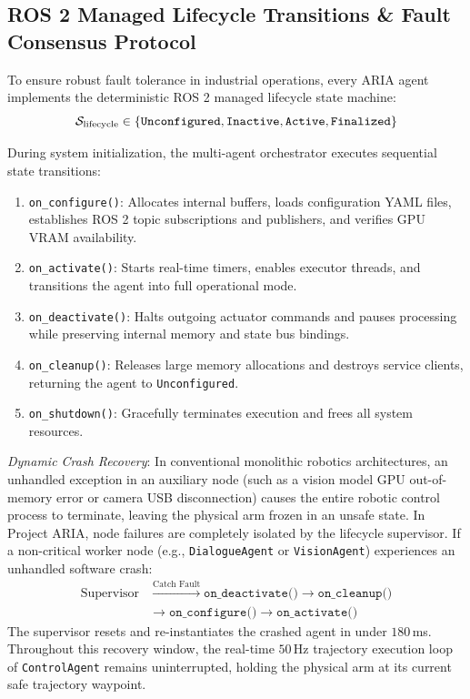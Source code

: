 \documentclass[journal]{IEEEtran}
\begin{document}
\subsection{ROS 2 Managed Lifecycle Transitions \& Fault Consensus Protocol}
To ensure robust fault tolerance in industrial operations, every ARIA agent implements the deterministic ROS 2 managed lifecycle state machine:
\begin{equation}
\mathcal{S}_{\text{lifecycle}} \in \{\text{\texttt{Unconfigured}}, \text{\texttt{Inactive}}, \text{\texttt{Active}}, \text{\texttt{Finalized}}\}
\end{equation}

During system initialization, the multi-agent orchestrator executes sequential state transitions:
\begin{enumerate}
    \item \texttt{on\_configure()}: Allocates internal buffers, loads configuration YAML files, establishes ROS 2 topic subscriptions and publishers, and verifies GPU VRAM availability.
    \item \texttt{on\_activate()}: Starts real-time timers, enables executor threads, and transitions the agent into full operational mode.
    \item \texttt{on\_deactivate()}: Halts outgoing actuator commands and pauses processing while preserving internal memory and state bus bindings.
    \item \texttt{on\_cleanup()}: Releases large memory allocations and destroys service clients, returning the agent to \texttt{Unconfigured}.
    \item \texttt{on\_shutdown()}: Gracefully terminates execution and frees all system resources.
\end{enumerate}

\textit{Dynamic Crash Recovery}: In conventional monolithic robotics architectures, an unhandled exception in an auxiliary node (such as a vision model GPU out-of-memory error or camera USB disconnection) causes the entire robotic control process to terminate, leaving the physical arm frozen in an unsafe state. In Project ARIA, node failures are completely isolated by the lifecycle supervisor. If a non-critical worker node (e.g., \texttt{DialogueAgent} or \texttt{VisionAgent}) experiences an unhandled software crash:
\begin{align}
\text{Supervisor} &\xrightarrow{\text{Catch Fault}} \texttt{on\_deactivate()} \to \texttt{on\_cleanup()} \nonumber \\
&\to \texttt{on\_configure()} \to \texttt{on\_activate()}
\end{align}
The supervisor resets and re-instantiates the crashed agent in under $180$\,ms. Throughout this recovery window, the real-time $50$\,Hz trajectory execution loop of \texttt{ControlAgent} remains uninterrupted, holding the physical arm at its current safe trajectory waypoint.
\end{document}
